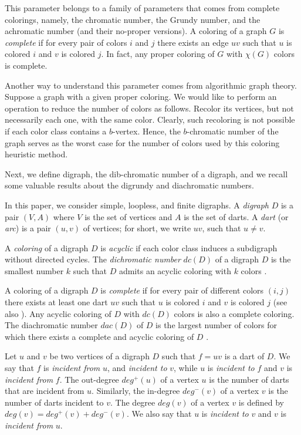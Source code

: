 \documentclass[12pt]{article}
\begin{document}
This parameter belongs to a family of parameters that comes from complete colorings, namely, the chromatic number, the Grundy number, and the achromatic number (and their no-proper versions). A coloring of a graph $G$ is \emph{complete} if for every pair of colors $i$ and $j$ there exists an edge $uv$ such that $u$ is colored $i$ and $v$ is colored $j$. In fact, any proper coloring of $G$ with $\chi(G)$ colors is complete.

Another way to understand this parameter comes from algorithmic graph theory. Suppose a graph with a given proper coloring. We would like to perform an operation to reduce the number of colors as follows. Recolor its vertices, but not necessarily each one, with the same color. Clearly, such recoloring is not possible if each color class contains a $b$-vertex. Hence, the $b$-chromatic number of the graph serves as the worst case for the number of colors used by this coloring heuristic method.

Next, we define digraph, the dib-chromatic number of a digraph, and we recall some valuable results about the digrundy and diachromatic numbers.

In this paper, we consider simple, loopless, and finite digraphs. A \emph{digraph} $D$ is a pair $(V,A)$ where $V$ is the set of vertices and $A$ is the set of darts. A \emph{dart} (or \emph{arc}) is a pair $(u,v)$ of vertices; for short, we write $uv$, such that $u\not=v$.

A \emph{coloring} of a digraph $D$ is \emph{acyclic} if each color class induces a subdigraph without directed cycles. The \emph{dichromatic number} $dc(D)$ of a digraph $D$ is the smallest number $k$ such that $D$ admits an acyclic coloring with $k$ colors \cite{MR693366}.

A coloring of a digraph $D$ is \emph{complete} if for every pair of different colors $(i,j)$ there exists at least one dart $uv$ such that $u$ is colored $i$ and $v$ is colored $j$ \cite{MR3329642} (see also \cite{MR2998438,MR2895432}). Any acyclic coloring of $D$ with $dc(D)$ colors is also a complete coloring. The diachromatic number $dac(D)$ of $D$ is the largest number of colors for which there exists a complete and acyclic coloring of $D$ \cite{MR3875016}.

Let $u$ and $v$ be two vertices of a digraph $D$ such that $f=uv$ is a dart of $D$. We say that $f$ is \emph{incident from} $u$, and \emph{incident to} $v$, while $u$ is \emph{incident to} $f$ and $v$ is \emph{incident from} $f$. The out-degree $deg ^+(u)$ of a vertex $u$ is the number of darts that are incident from $u$. Similarly, the in-degree $deg^-(v)$ of a vertex $v$ is the number of darts incident to $v$. The degree $deg(v)$ of a vertex $v$ is defined by $deg(v)=deg^+(v)+ deg^-(v)$. We also say that $u$ is \emph{incident to} $v$ and $v$ is \emph{incident from} $u$.
\end{document}
